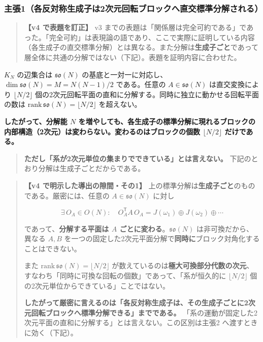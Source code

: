 \documentclass[
  10pt,
]{ltjsarticle}
\begin{document}
\subsubsection{主張1（各反対称生成子は2次元回転ブロックへ直交標準分解される）}\label{ux4e3bux5f351ux5404ux53cdux5bfeux79f0ux751fux6210ux5b50ux306f2ux6b21ux5143ux56deux8ee2ux30d6ux30edux30c3ux30afux3078ux76f4ux4ea4ux6a19ux6e96ux5206ux89e3ux3055ux308cux308b}

\begin{quote}
\textbf{【v4 で表題を訂正】} v3
までの表題は「関係層は完全可約である」であった。「完全可約」は表現論の語であり、ここで実際に証明している内容（各生成子の直交標準分解）とは異なる。また分解は\textbf{生成子ごと}であって層全体に共通の分解ではない（下記）。表題を証明内容に合わせた。
\end{quote}

\(K_N\) の辺集合は \(\mathfrak{so}(N)\)
の基底と一対一に対応し、\(\dim\mathfrak{so}(N) = M = N(N-1)/2\)
である。任意の \(A \in \mathfrak{so}(N)\) は直交変換により
\(\lfloor N/2\rfloor\)
個の2次元回転平面の直和に分解する。同時に独立に動かせる回転平面の数は
\(\mathrm{rank}\,\mathfrak{so}(N) = \lfloor N/2\rfloor\) を超えない。

\textbf{したがって、分解能 \(N\)
を増やしても、各生成子の標準分解に現れるブロックの内部構造（2次元）は変わらない。変わるのはブロックの個数
\(\lfloor N/2\rfloor\) だけである。}

\begin{quote}
\textbf{ただし「系が2次元単位の集まりでできている」とは言えない。}
下記のとおり分解は生成子ごとだからである。
\end{quote}

\begin{quote}
\textbf{【v4 で明示した導出の隙間・その1】}
上の標準分解は\textbf{生成子ごと}のものである。厳密には、任意の
\(A \in \mathfrak{so}(N)\) に対し

\[\exists\, O_A \in O(N): \quad O_A^{\mathsf T} A\, O_A = J(\omega_1)\oplus J(\omega_2)\oplus\cdots\]

であって、\textbf{分解する平面は \(A\)
ごとに変わる}。\(\mathfrak{so}(N)\) は非可換だから、異なる \(A, B\)
を一つの固定した2次元平面分解で\textbf{同時に}ブロック対角化することはできない。

また \(\mathrm{rank}\,\mathfrak{so}(N) = \lfloor N/2\rfloor\)
が数えているのは\textbf{極大可換部分代数の次元}、すなわち「同時に可換な回転の個数」であって、「系が恒久的に
\(\lfloor N/2\rfloor\) 個の2次元単位からできている」ことではない。

\textbf{したがって厳密に言えるのは「各反対称生成子は、その生成子ごとに2次元回転ブロックへ標準分解できる」までである。}
「系の運動が固定した2次元平面の直和に分解する」とは言えない。この区別は主張2
へ渡すときに効く（下記）。
\end{quote}
\end{document}
